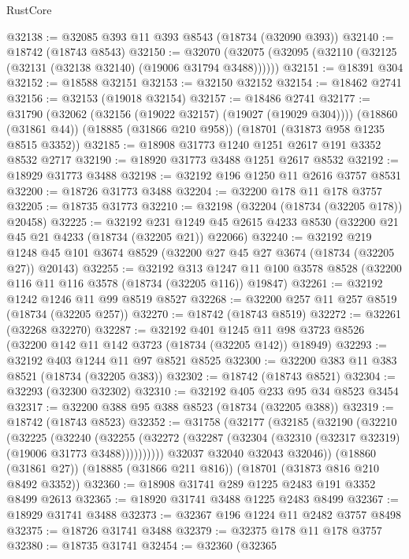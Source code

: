\begin{lexlean}{RustCore}
\begin{coremodule}
@32138 := @32085 @393 @11 @393 @8543 (@18734 (@32090 @393))
@32140 := @18742 (@18743 @8543)
@32150 := @32070 (@32075 (@32095 (@32110 (@32125 (@32131 (@32138 @32140) (@19006 @31794 @3488))))))
@32151 := @18391 @304
@32152 := @18588 @32151
@32153 := @32150 @32152
@32154 := @18462 @2741
@32156 := @32153 (@19018 @32154)
@32157 := @18486 @2741
@32177 := @31790
    (@32062 (@32156 (@19022 @32157) (@19027 (@19029 @304))))
    (@18860 (@31861 @44))
    (@18885 (@31866 @210 @958))
    (@18701 (@31873 @958 @1235 @8515 @3352))
@32185 := @18908 @31773 @1240 @1251 @2617 @191 @3352 @8532 @2717
@32190 := @18920 @31773 @3488 @1251 @2617 @8532
@32192 := @18929 @31773 @3488
@32198 := @32192 @196 @1250 @11 @2616 @3757 @8531
@32200 := @18726 @31773 @3488
@32204 := @32200 @178 @11 @178 @3757
@32205 := @18735 @31773
@32210 := @32198 (@32204 (@18734 (@32205 @178)) @20458)
@32225 := @32192
    @231
    @1249
    @45
    @2615
    @4233
    @8530
    (@32200 @21 @45 @21 @4233 (@18734 (@32205 @21)) @22066)
@32240 := @32192
    @219
    @1248
    @45
    @101
    @3674
    @8529
    (@32200 @27 @45 @27 @3674 (@18734 (@32205 @27)) @20143)
@32255 := @32192
    @313
    @1247
    @11
    @100
    @3578
    @8528
    (@32200 @116 @11 @116 @3578 (@18734 (@32205 @116)) @19847)
@32261 := @32192 @1242 @1246 @11 @99 @8519 @8527
@32268 := @32200 @257 @11 @257 @8519 (@18734 (@32205 @257))
@32270 := @18742 (@18743 @8519)
@32272 := @32261 (@32268 @32270)
@32287 := @32192
    @401
    @1245
    @11
    @98
    @3723
    @8526
    (@32200 @142 @11 @142 @3723 (@18734 (@32205 @142)) @18949)
@32293 := @32192 @403 @1244 @11 @97 @8521 @8525
@32300 := @32200 @383 @11 @383 @8521 (@18734 (@32205 @383))
@32302 := @18742 (@18743 @8521)
@32304 := @32293 (@32300 @32302)
@32310 := @32192 @405 @233 @95 @34 @8523 @3454
@32317 := @32200 @388 @95 @388 @8523 (@18734 (@32205 @388))
@32319 := @18742 (@18743 @8523)
@32352 := @31758
    (@32177
      (@32185
        (@32190
          (@32210
            (@32225
              (@32240
                (@32255
                  (@32272 (@32287 (@32304 (@32310 (@32317 @32319) (@19006 @31773 @3488))))))))))
        @32037
        @32040
        @32043
        @32046))
    (@18860 (@31861 @27))
    (@18885 (@31866 @211 @816))
    (@18701 (@31873 @816 @210 @8492 @3352))
@32360 := @18908 @31741 @289 @1225 @2483 @191 @3352 @8499 @2613
@32365 := @18920 @31741 @3488 @1225 @2483 @8499
@32367 := @18929 @31741 @3488
@32373 := @32367 @196 @1224 @11 @2482 @3757 @8498
@32375 := @18726 @31741 @3488
@32379 := @32375 @178 @11 @178 @3757
@32380 := @18735 @31741
@32454 := @32360
    (@32365

\end{coremodule}
\end{lexlean}
